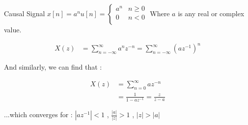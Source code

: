 \documentclass{beamer}
\begin{document}
\begin{frame}{Causal  Signal}
    $x[n] = a^{n}u[n] =  
    \begin{cases}
        a^{n} & n \geq 0\\
        0 & n < 0\\
    \end{cases}
    $ Where $a$ is any real or complex value.
    
    \begin{align*}
    {X(z)} &= \sum_{n=-\infty}^{\infty} a^{n} z^{-n} = \sum_{n=-\infty}^{\infty} (az^{-1})^{n}
    \end{align*}
    
    And similarly, we can find that :
    
    \begin{align*}
    {X(z)} &= \sum_{n=0}^{\infty} az^{-n} \\ 
           &= \frac{1}{1-az^{-1}} = \boxed{\frac{z}{z-a}}
    \end{align*}
    
    ...which converges for : $|az^{-1}| < 1$ , $\frac{|a|}{|z|} > 1$ , $|z| > |a|$
    
    
\end{frame}
\end{document}
